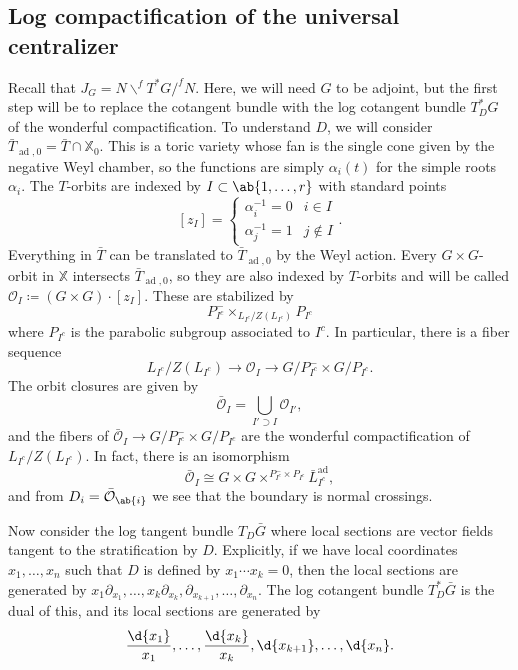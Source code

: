 \documentclass{amsart}
\theoremstyle{definition}
\theoremstyle{remark}
\theoremstyle{plain}
\theoremstyle{definition}
\theoremstyle{remark}
\newcommand{\mc}[1]{\mathcal{#1}}
\newcommand{\mbb}[1]{\mathbb{#1}}
\newcommand{\1}{\mathbf{1}}
\newcommand{\2}{\mathbf{2}}
\newcommand{\3}{\mathbf{3}}
\DeclareMathOperator{\ad}{ad}
\begin{document}
\subsection{Log compactification of the universal centralizer}%
\label{sub:Log compactification of the universal centralizer}

Recall that \(J_G = N \backslash^f T^* G /^f N\). Here, we will need \(G\) to be adjoint, but the first step will be to replace the cotangent bundle with the log cotangent bundle \(T_D^* G\) of the wonderful compactification. To understand \(D\), we will consider \(\bar{T}_{\ad, 0} = \bar{T} \cap \mbb{X}_0\). This is a toric variety whose fan is the single cone given by the negative Weyl chamber, so the functions are simply \(\alpha_i(t)\) for the simple roots \(\alpha_i\). The \(T\)-orbits are indexed by \(I \subset \ab\{ 1, \ldots, r\}\) with standard points
\[ [z_I] = \begin{cases}
    \alpha_i^{-1} = 0 & i \in I \\
    \alpha_j^{-1} = 1 & j \notin I
\end{cases}. \]
Everything in \(\bar{T}\) can be translated to \(\bar{T}_{\ad, 0}\) by the Weyl action. Every \(G \times G\)-orbit in \(\mbb{X}\) intersects \(\bar{T}_{\ad, 0}\), so they are also indexed by \(T\)-orbits and will be called \(\mc{O}_I \coloneqq (G \times G) \cdot [z_I]\). These are stabilized by
\[ P_{I^c}^- \times_{L_{I^c}/Z(L_{I^c})} P_{I^c} \]
where \(P_{I^c}\) is the parabolic subgroup associated to \(I^c\). In particular, there is a fiber sequence
\[ L_{I^c}/Z(L_{I^c}) \to \mc{O}_I \to G/P_{I^c}^- \times G/P_{I^c}. \]
The orbit closures are given by
\[ \bar{\mc{O}}_I = \bigcup_{I' \supset I} \mc{O}_{I'}, \]
and the fibers of \(\bar{\mc{O}}_I \to G/P_{I^c}^- \times G/P_{I^c}\) are the wonderful compactification of \(L_{I^c}/Z(L_{I^c})\). In fact, there is an isomorphism
\[ \bar{\mc{O}}_I \cong G \times G \times^{P_{I^c}^- \times P_{I^c}} \bar{L}_{I^c}^{\ad}, \]
and from \(D_i = \bar{\mc{O}}_{\ab\{i\}}\) we see that the boundary is normal crossings.

Now consider the log tangent bundle \(T_D \bar{G}\) where local sections are vector fields tangent to the stratification by \(D\). Explicitly, if we have local coordinates \(x_1, \ldots, x_n\) such that \(D\) is defined by \(x_1 \cdots x_k = 0\), then the local sections are generated by \(x_1 \partial_{x_1}, \ldots, x_k \partial_{x_k}, \partial_{x_{k+1}}, \ldots, \partial_{x_n}\). The log cotangent bundle \(T_D^* \bar{G}\) is the dual of this, and its local sections are generated by
\[ \frac{\d{x_1}}{x_1}, \ldots, \frac{\d{x_k}}{x_k}, \d{x_{k+1}}, \ldots, \d{x_n}. \]
\end{document}
